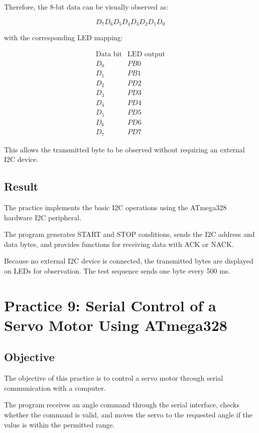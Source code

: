 \documentclass[12pt,a4paper]{article}
\begin{document}
Therefore, the 8-bit data can be visually observed as:

\[
D_7D_6D_5D_4D_3D_2D_1D_0
\]

with the corresponding LED mapping:

\[
\begin{array}{c|c}
\text{Data bit} & \text{LED output} \\
\hline
D_0 & PB0 \\
D_1 & PB1 \\
D_2 & PD2 \\
D_3 & PD3 \\
D_4 & PD4 \\
D_5 & PD5 \\
D_6 & PD6 \\
D_7 & PD7
\end{array}
\]

This allows the transmitted byte to be observed without requiring an
external I2C device.

\subsection{Result}

The practice implements the basic I2C operations using the ATmega328
hardware I2C peripheral.

The program generates START and STOP conditions, sends the I2C address
and data bytes, and provides functions for receiving data with ACK or
NACK.

Because no external I2C device is connected, the transmitted bytes are
displayed on LEDs for observation. The test sequence sends one byte
every 500 ms.


\section{Practice 9: Serial Control of a Servo Motor Using ATmega328}

\subsection{Objective}

The objective of this practice is to control a servo motor through
serial communication with a computer.

The program receives an angle command through the serial interface,
checks whether the command is valid, and moves the servo to the
requested angle if the value is within the permitted range.
\end{document}
